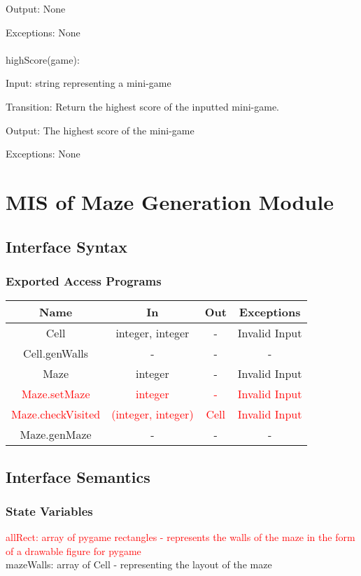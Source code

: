 \documentclass[12pt, titlepage]{article}
\begin{document}
		Output: None
		
		Exceptions: None\\
		\\
		highScore(game):
		
		Input: string representing a mini-game
		
		Transition: Return the highest score of the inputted mini-game.
		
		Output: The highest score of the mini-game
		
		Exceptions: None
	
	
	
\section{MIS of Maze Generation Module}
		\subsection{Interface Syntax}
		\subsubsection{Exported Access Programs}
		\begin{tabular}[pos]{|c|c|c|c|}
			\hline
			\textbf{Name}& \textbf{In} & \textbf{Out} & \textbf{Exceptions} \\ \hline
			Cell & integer, integer & - & Invalid Input \\ \hline
			Cell.genWalls & - & - & - \\ \hline
			Maze & integer & - & Invalid Input \\ \hline
			\textcolor{red}{Maze.setMaze} & \textcolor{red}{integer} & \textcolor{red}{-} & \textcolor{red}{Invalid Input} \\ \hline
			\textcolor{red}{Maze.checkVisited} & \textcolor{red}{(integer, integer)} & \textcolor{red}{Cell} & \textcolor{red}{Invalid Input} \\ \hline
			Maze.genMaze & - & - & - \\ \hline
		\end{tabular}
		
		\subsection{Interface Semantics}
		\subsubsection{State Variables}
		\textcolor{red}{allRect: array of pygame rectangles - represents the walls of the maze in the form of a drawable figure for pygame} \\
		mazeWalls: array of Cell - representing the layout of the maze
		
\end{document}

